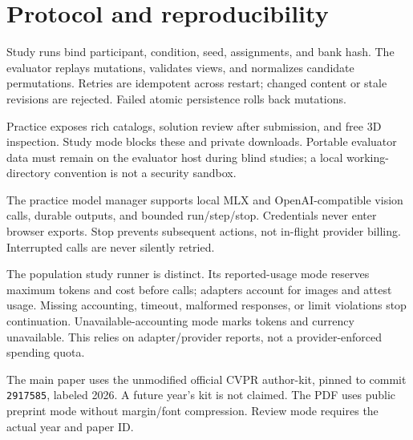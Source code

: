 \section{Protocol and reproducibility}
Study runs bind participant, condition, seed, assignments, and bank hash.
The evaluator replays mutations, validates views, and normalizes candidate
permutations. Retries are idempotent across restart; changed content or
stale revisions are rejected. Failed atomic persistence rolls back mutations.

Practice exposes rich catalogs, solution review after submission, and
free 3D inspection. Study mode blocks these and private downloads.
Portable evaluator data must remain on the evaluator host during blind
studies; a local working-directory convention is not a security sandbox.

The practice model manager supports local MLX and OpenAI-compatible
vision calls, durable outputs, and bounded run/step/stop. Credentials
never enter browser exports. Stop prevents subsequent actions, not
in-flight provider billing. Interrupted calls are never silently retried.

The population study runner is distinct. Its reported-usage mode reserves
maximum tokens and cost before calls; adapters account for images and
attest usage. Missing accounting, timeout, malformed responses, or limit
violations stop continuation. Unavailable-accounting mode marks tokens
and currency unavailable. This relies on adapter/provider reports, not
a provider-enforced spending quota.

The main paper uses the unmodified official CVPR author-kit, pinned to
commit \texttt{2917585}, labeled 2026. A future year's kit is not claimed.
The PDF uses public preprint mode without margin/font compression.
Review mode requires the actual year and paper ID.

